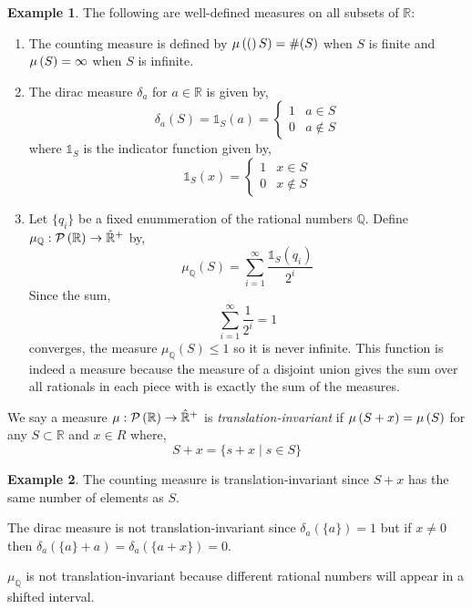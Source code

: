 \documentclass{article}
\newcommand{\Q}{\mathbb{Q}}
\newcommand{\R}{\mathbb{R}}
\newcommand{\indic}[1]{\mathds{1}_{#1}}
\newenvironment{definition}[1][Definition:]{\begin{trivlist}
\item[\hskip \labelsep {\bfseries #1}]}{\end{trivlist}}
\theoremstyle{theorem}
\theoremstyle{definition}
\theoremstyle{definition}
\theoremstyle{remark}
\theoremstyle{definition}
\newtheorem{example}{Example}[section]
\theoremstyle{remark}
\begin{document}
\begin{example}
The following are well-defined measures on all subsets of $\R$:
\begin{enumerate}
\item The counting measure is defined by $\mu\left( ( \right)S) = \#(S)$ when $S$ is finite and $\mu\left( S \right) = \infty$ when $S$ is infinite.

\item The dirac measure $\delta_a$ for $a \in \R$ is given by,
\[ \delta_a(S) = \indic{S}(a) = 
\begin{cases}
1 & a \in S
\\
0 & a \notin S
\end{cases} \]
where $\indic{S}$ is the indicator function given by,
\[ \indic{S}(x) = 
\begin{cases}
1 & x \in S
\\
0 & x \notin S
\end{cases} \]

\item Let $\{q_i\}$ be a fixed enummeration of the rational numbers $\Q$. Define $\mu_\Q : \Power{\R} \to \Rcomp$ by,
\[ \mu_{\Q}(S) = \sum_{i = 1}^\infty \frac{\indic{S}(q_i)}{2^i} \]
Since the sum,
\[ \sum_{i = 1}^\infty \frac{1}{2^i} = 1 \]
converges, the measure $\mu_{\Q}(S) \le 1$ so it is never infinite. This function is indeed a measure because the measure of a disjoint union gives the sum over all rationals in each piece with is exactly the sum of the measures. 
\end{enumerate}
\end{example}

\begin{definition}
We say a measure $\mu : \Power{\R} \to \Rcomp$ is \textit{translation-invariant} if $\mu\left( S + x \right) = \mu\left( S \right)$ for any $S \subset \R$ and $x \in R$ where,
\[ S + x = \{ s + x \mid s \in S \} \]
\end{definition}

\begin{example}
\item The counting measure is translation-invariant since $S + x$ has the same number of elements as $S$.

\item The dirac measure is not translation-invariant since $\delta_a(\{a\}) = 1$ but if $x \neq 0$ then $\delta_{a}(\{a\} + a) = \delta_a(\{a + x\}) = 0$.

\item  $\mu_{\Q}$ is not translation-invariant because different rational numbers will appear in a shifted interval.
\end{example}
\end{document}
